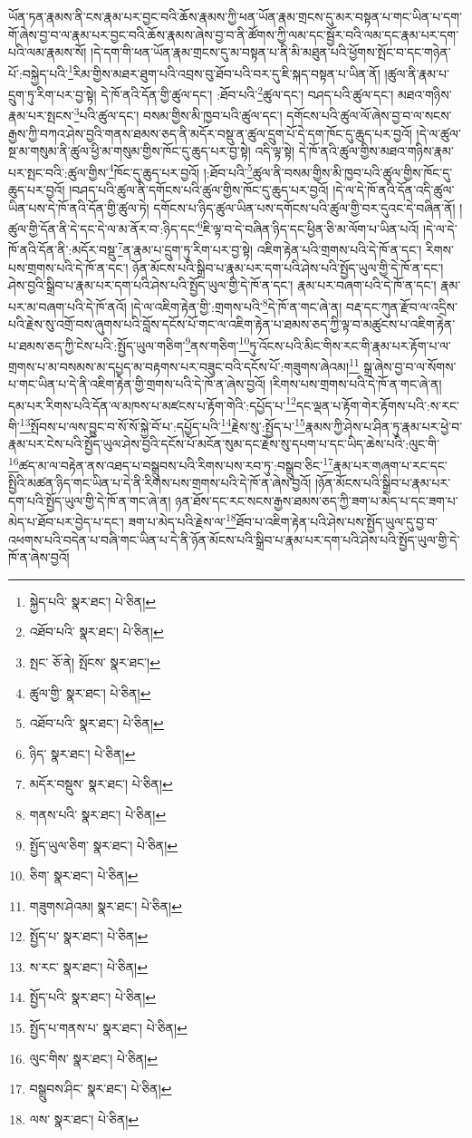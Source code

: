 ཡོན་ཏན་རྣམས་ནི་ངས་རྣམ་པར་བྱང་བའི་ཆོས་རྣམས་ཀྱི་ཕན་ཡོན་རྣམ་གྲངས་དུ་མར་བསྟན་པ་གང་ཡིན་པ་དག་གོ་ཞེས་བྱ་བ་ལ་རྣམ་པར་བྱང་བའི་ཆོས་རྣམས་ཞེས་བྱ་བ་ནི་ཚོགས་ཀྱི་ལམ་དང་སྦྱོར་བའི་ལམ་དང་རྣམ་པར་དག་པའི་ལམ་རྣམས་སོ། །དེ་དག་གི་ཕན་ཡོན་རྣམ་གྲངས་དུ་མ་བསྟན་པ་ནི་མི་མཐུན་པའི་ཕྱོགས་སྤོང་བ་དང་གཉེན་པོ་:བསྐྱེད་པའི་\footnote{སྐྱེད་པའི་  སྣར་ཐང་།  པེ་ཅིན། }རིམ་གྱིས་མཐར་ཐུག་པའི་འབྲས་བུ་ཐོབ་པའི་བར་དུ་ཇི་སྐད་བསྟན་པ་ཡིན་ནོ། །ཚུལ་ནི་རྣམ་པ་དྲུག་ཏུ་རིག་པར་བྱ་སྟེ། དེ་ཁོ་ནའི་དོན་གྱི་ཚུལ་དང་། :ཐོབ་པའི་\footnote{འཐོབ་པའི་  སྣར་ཐང་།  པེ་ཅིན། }ཚུལ་དང་། བཤད་པའི་ཚུལ་དང་། མཐའ་གཉིས་རྣམ་པར་སྤངས་\footnote{སྤང་  ཅོ་ནེ། སྤོངས་  སྣར་ཐང་། }པའི་ཚུལ་དང་། བསམ་གྱིས་མི་ཁྱབ་པའི་ཚུལ་དང་། དགོངས་པའི་ཚུལ་ལོ་ཞེས་བྱ་བ་ལ་སངས་རྒྱས་ཀྱི་བཀའ་ཤེས་བྱའི་གནས་ཐམས་ཅད་ནི་མདོར་བསྡུ་ན་ཚུལ་དྲུག་པོ་དེ་དག་ཁོང་དུ་ཆུད་པར་བྱའོ། །དེ་ལ་ཚུལ་སྔ་མ་གསུམ་ནི་ཚུལ་ཕྱི་མ་གསུམ་གྱིས་ཁོང་དུ་ཆུད་པར་བྱ་སྟེ། འདི་ལྟ་སྟེ། དེ་ཁོ་ནའི་ཚུལ་གྱིས་མཐའ་གཉིས་རྣམ་པར་སྤང་བའི་:ཚུལ་གྱིས་\footnote{ཚུལ་གྱི་  སྣར་ཐང་།  པེ་ཅིན། }ཁོང་དུ་ཆུད་པར་བྱའོ། །:ཐོབ་པའི་\footnote{འཐོབ་པའི་  སྣར་ཐང་།  པེ་ཅིན། }ཚུལ་ནི་བསམ་གྱིས་མི་ཁྱབ་པའི་ཚུལ་གྱིས་ཁོང་དུ་ཆུད་པར་བྱའོ། །བཤད་པའི་ཚུལ་ནི་དགོངས་པའི་ཚུལ་གྱིས་ཁོང་དུ་ཆུད་པར་བྱའོ། །དེ་ལ་དེ་ཁོ་ནའི་དོན་འདི་ཚུལ་ཡིན་པས་དེ་ཁོ་ནའི་དོན་གྱི་ཚུལ་ཏེ། དགོངས་པ་ཉིད་ཚུལ་ཡིན་པས་དགོངས་པའི་ཚུལ་གྱི་བར་དུའང་དེ་བཞིན་ནོ། །ཚུལ་གྱི་དོན་ནི་དེ་དང་དེ་ལ་མ་ནོར་བ་:ཉིད་དང་\footnote{ཉིད་  སྣར་ཐང་།  པེ་ཅིན། }ཇི་ལྟ་བ་དེ་བཞིན་ཉིད་དང་ཕྱིན་ཅི་མ་ལོག་པ་ཡིན་པའོ། །དེ་ལ་དེ་ཁོ་ནའི་དོན་ནི་:མདོར་བསྡུ་\footnote{མདོར་བསྡུས་  སྣར་ཐང་།  པེ་ཅིན། }ན་རྣམ་པ་དྲུག་ཏུ་རིག་པར་བྱ་སྟེ། འཇིག་རྟེན་པའི་གྲགས་པའི་དེ་ཁོ་ན་དང་། རིགས་པས་གྲགས་པའི་དེ་ཁོ་ན་དང་། ཉོན་མོངས་པའི་སྒྲིབ་པ་རྣམ་པར་དག་པའི་ཤེས་པའི་སྤྱོད་ཡུལ་གྱི་དེ་ཁོ་ན་དང་། ཤེས་བྱའི་སྒྲིབ་པ་རྣམ་པར་དག་པའི་ཤེས་པའི་སྤྱོད་ཡུལ་གྱི་དེ་ཁོ་ན་དང་། རྣམ་པར་བཞག་པའི་དེ་ཁོ་ན་དང་། རྣམ་པར་མ་བཞག་པའི་དེ་ཁོ་ནའོ། །དེ་ལ་འཇིག་རྟེན་གྱི་:གྲགས་པའི་\footnote{གནས་པའི་  སྣར་ཐང་།  པེ་ཅིན། }དེ་ཁོ་ན་གང་ཞེ་ན། བརྡ་དང་ཀུན་རྫོབ་ལ་འདྲིས་པའི་རྗེས་སུ་འགྲོ་བས་ཞུགས་པའི་བློས་དངོས་པོ་གང་ལ་འཇིག་རྟེན་པ་ཐམས་ཅད་ཀྱི་ལྟ་བ་མཚུངས་པ་འཇིག་རྟེན་པ་ཐམས་ཅད་ཀྱི་ངེས་པའི་:སྤྱོད་ཡུལ་གཅིག་\footnote{སྤྱོད་ཡུལ་ཅིག་  སྣར་ཐང་།  པེ་ཅིན། }ནས་གཅིག་\footnote{ཅིག་  སྣར་ཐང་།  པེ་ཅིན། }ཏུ་འོངས་པའི་མིང་གིས་རང་གི་རྣམ་པར་རྟོག་པ་ལ་གྲགས་པ་མ་བསམས་མ་དཔྱད་མ་བརྟགས་པར་བཟུང་བའི་དངོས་པོ་:གཟུགས་ཞེའམ།\footnote{གཟུགས་ཤེའམ།  སྣར་ཐང་།  པེ་ཅིན། } སྒྲ་ཞེས་བྱ་བ་ལ་སོགས་པ་གང་ཡིན་པ་དེ་ནི་འཇིག་རྟེན་གྱི་གྲགས་པའི་དེ་ཁོ་ན་ཞེས་བྱའོ། །རིགས་པས་གྲགས་པའི་དེ་ཁོ་ན་གང་ཞེ་ན། དམ་པར་རིགས་པའི་དོན་ལ་མཁས་པ་མཛངས་པ་རྟོག་གེའི་:དཔྱོད་པ་\footnote{སྤྱོད་པ་  སྣར་ཐང་།  པེ་ཅིན། }དང་ལྡན་པ་རྟོག་གེར་རྟོགས་པའི་:ས་རང་གི་\footnote{ས་རང་  སྣར་ཐང་།  པེ་ཅིན། }སྤོབས་པ་ལས་བྱུང་བ་སོ་སོ་སྐྱེ་བོ་པ་:དཔྱོད་པའི་\footnote{སྤྱོད་པའི་  སྣར་ཐང་།  པེ་ཅིན། }རྗེས་སུ་:སྤྱོད་པ་\footnote{སྤྱོད་པ་གནས་པ་  སྣར་ཐང་།  པེ་ཅིན། }རྣམས་ཀྱི་ཤེས་པ་ཤིན་ཏུ་རྣམ་པར་ཕྱེ་བ་རྣམ་པར་ངེས་པའི་སྤྱོད་ཡུལ་ཤེས་བྱའི་དངོས་པོ་མངོན་སུམ་དང་རྗེས་སུ་དཔག་པ་དང་ཡིད་ཆེས་པའི་:ལུང་གི་\footnote{ལུང་གིས་  སྣར་ཐང་།  པེ་ཅིན། }ཚད་མ་ལ་བརྟེན་ནས་འཐད་པ་བསྒྲུབས་པའི་རིགས་པས་རབ་ཏུ་:བསྒྲུབ་ཅིང་\footnote{བསྒྲུབས་ཤིང་  སྣར་ཐང་།  པེ་ཅིན། }རྣམ་པར་གཞག་པ་རང་དང་སྤྱིའི་མཚན་ཉིད་གང་ཡིན་པ་དེ་ནི་རིགས་པས་གྲགས་པའི་དེ་ཁོ་ན་ཞེས་བྱའོ། །ཉོན་མོངས་པའི་སྒྲིབ་པ་རྣམ་པར་དག་པའི་སྤྱོད་ཡུལ་གྱི་དེ་ཁོ་ན་གང་ཞེ་ན། ཉན་ཐོས་དང་རང་སངས་རྒྱས་ཐམས་ཅད་ཀྱི་ཟག་པ་མེད་པ་དང་ཟག་པ་མེད་པ་ཐོབ་པར་བྱེད་པ་དང་། ཟག་པ་མེད་པའི་རྗེས་ལ་\footnote{ལས་  སྣར་ཐང་།  པེ་ཅིན། }ཐོབ་པ་འཇིག་རྟེན་པའི་ཤེས་པས་སྤྱོད་ཡུལ་དུ་བྱ་བ་འཕགས་པའི་བདེན་པ་བཞི་གང་ཡིན་པ་དེ་ནི་ཉོན་མོངས་པའི་སྒྲིབ་པ་རྣམ་པར་དག་པའི་ཤེས་པའི་སྤྱོད་ཡུལ་གྱི་དེ་ཁོ་ན་ཞེས་བྱའོ། 